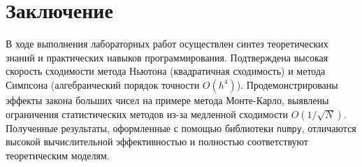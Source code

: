 \documentclass[a4paper,14pt]{extarticle}
\begin{document}
\section*{Заключение}
В ходе выполнения лабораторных работ осуществлен синтез теоретических знаний и практических навыков программирования. Подтверждена высокая скорость сходимости метода Ньютона (квадратичная сходимость) и метода Симпсона (алгебраический порядок точности $O(h^4)$). Продемонстрированы эффекты закона больших чисел на примере метода Монте-Карло, выявлены ограничения статистических методов из-за медленной сходимости $O(1/\sqrt{N})$. Полученные результаты, оформленные с помощью библиотеки \texttt{numpy}, отличаются высокой вычислительной эффективностью и полностью соответствуют теоретическим моделям.
\end{document}
